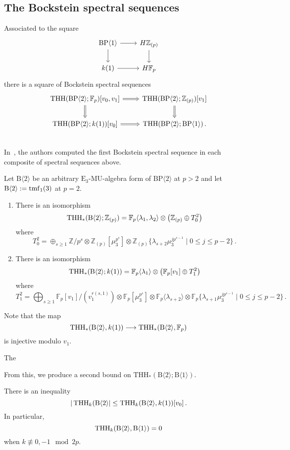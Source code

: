 \subsection{The Bockstein spectral sequences}

Associated to the square 
\[
\begin{tikzcd}
\BP\langle 1\rangle \ar[r] \ar[d] & H\mathbb{Z}_{(p)} \ar[d] \\ 
k(1) \ar[r] & H\mathbb{F}_p
\end{tikzcd}
\]
there is a square of Bockstein spectral sequences \[
\begin{tikzcd}
\THH(\BP\langle 2\rangle ;\mathbb{F}_p)[v_0,v_1]\arrow[Rightarrow]{r} \arrow[Rightarrow]{d} &  \THH(\BP\langle 2\rangle ;\mathbb{Z}_{(p)})[v_1]\arrow[Rightarrow]{d}\\ 
\THH(\BP\langle 2\rangle ;k(1))[v_0]\arrow[Rightarrow]{r}  &  \THH(\BP\langle 2\rangle ;\BP\langle 1\rangle)\,. \\ 
\end{tikzcd}
\]
In~\cite{AKCH24}, the authors computed the first Bockstein spectral sequence in each composite of spectral sequences above. 
\begin{theorem}
Let $\mathrm{B}\langle 2\rangle$ be an arbitrary $\mathrm{E}_3$-$\mathrm{MU}$-algebra form of $\mathrm{BP}\langle 2\rangle$ at $p>2$ and let $\mathrm{B}\langle 2\rangle:=\mathrm{tmf}_1(3)$ at $p=2$. 
\begin{enumerate}
\item There is an isomorphism 
\[ 
\operatorname{THH}_*(\mathrm{B}\langle 2\rangle ;\mathbb{Z}_{(p)})=\mathbb{F}_p\langle \lambda_1 ,\lambda_2\rangle \otimes \left ( \mathbb{Z}_{(p)}\oplus T_0^2 \right )
\]
where 
\[ T_0^2 = \oplus_{s\ge 1} \mathbb{Z}/p^s\otimes \mathbb{Z}_{(p)}[\mu_3^{p^s}]\otimes \mathbb{Z}_{(p)}\{\lambda_{s+2}\mu_3^{jp^{s-1}} \mid 0\le j\le p-2 \} \,. 
\]
\item There is an isomorphism
\[
\operatorname{THH}_*(\mathrm{B}\langle 2\rangle ;k(1))= \mathbb{F}_p\langle \lambda_1 \rangle \otimes \left ( \mathbb{F}_p[v_1]\oplus T_1^2 \right ) 
\]
where 
\[ T_1^2=\bigoplus_{s\ge 1}\mathbb{F}_p[v_1]/(v_1^{r(s,1)})\otimes \mathbb{F}_p[\mu_3^{p^s}]\otimes \mathbb{F}_p\langle \lambda_{s+2}\rangle \otimes \mathbb{F}_p\{ \lambda_{s+1}\mu_3^{jp^{s-1}} \mid 0\le j\le p-2 \} \,.\]
\end{enumerate}
\end{theorem}

Note that the map 
\[ 
\operatorname{THH}_*(\mathrm{B}\langle 2\rangle , k(1))\longrightarrow \operatorname{THH}_*(\mathrm{B}\langle 2\rangle ,\mathbb{F}_p)
\]
is injective modulo $v_1$. 
\begin{theorem}
The 	
\end{theorem}



From this, we produce a second bound on $\mathrm{THH}_*(\mathrm{B}\langle 2\rangle;\mathrm{B}\langle 1\rangle)$. 
\begin{corollary}
There is an inequality 
\[ |\operatorname{THH}_k(\mathrm{B}\langle 2\rangle |\le \operatorname{THH}_k(\mathrm{B}\langle 2\rangle , k(1))[v_0]\,. \]
In particular, 
\[
\operatorname{THH}_k(\mathrm{B}\langle 2\rangle , \mathrm{B}\langle 1\rangle ) =0 
\]
when $k\not \equiv 0,-1\mod 2p$. 
\end{corollary}
